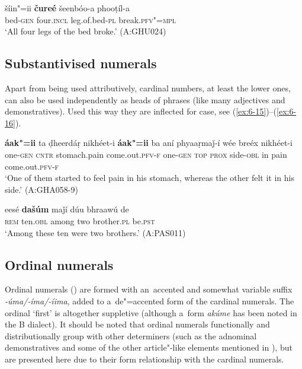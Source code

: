 \begin{exe}
\ex
\label{ex:6-14}
\gll šíin"=ii \textbf{čureé} šeenbóo-a phooṭíl-a \\
bed-\textsc{gen} four.\textsc{incl} leg.of.bed-\textsc{pl} break.\textsc{pfv"=mpl} \\
\glt `All four legs of the bed broke.' (A:GHU024)
\end{exe}

\subsection{Substantivised numerals}
\label{subsec:6-4-2}


Apart from being used attributively, cardinal numbers, at least the lower ones, can also be used independently as heads of  phrases (like many adjectives and demonstratives). Used this way they are inflected for case, see (\ref{ex:6-15})--(\ref{ex:6-16}).

\ea
\label{ex:6-15}
\gll \textbf{áak"=ii} ta ḍheerdáṛ nikhéet-i \textbf{áak"=ii} ba  aní phyaaṛmaǰ-í wée
breéx nikhéet-i \\
one-\textsc{gen} \textsc{cntr} stomach.pain come.out.\textsc{pfv-f} one-\textsc{gen} \textsc{top} \textsc{prox} side-\textsc{obl} in pain come.out.\textsc{pfv-f} \\
\glt `One of them started to feel pain in his stomach, whereas the other felt it in his side.'
(A:GHA058-9)

\ex
\label{ex:6-16}
\gll eesé \textbf{dašúm} maǰí dúu bhraawú de  \\
\textsc{rem} ten.\textsc{obl} among two brother.\textsc{pl} be.\textsc{pst}  \\
\glt `Among these ten were two brothers.' (A:PAS011)
\z

\subsection{Ordinal numerals}
\label{subsec:6-4-3}

Ordinal numerals () are formed with an~accented and somewhat variable suffix \textit{-úma/-íma/-íima}, added to a~de"=accented form of the cardinal numerals. The ordinal `first' is altogether suppletive (although a~form \textit{akúme} has been noted in the B dialect). It should be noted that ordinal numerals functionally and distributionally group with other determiners (such as the adnominal demonstratives and some of the other article"-like elements mentioned in ), but are presented here due to their form relationship with the cardinal numerals.



